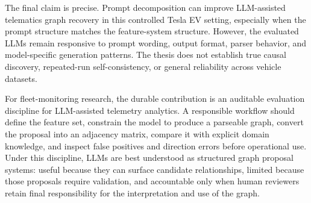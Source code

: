 The final claim is precise. Prompt decomposition can improve
LLM-assisted telematics graph recovery in this controlled Tesla EV setting,
especially when the prompt structure matches the feature-system structure.
However, the evaluated LLMs remain responsive to prompt wording, output format,
parser behavior, and model-specific generation patterns. The thesis does not
establish true causal discovery, repeated-run self-consistency, or general
reliability across vehicle datasets.

For fleet-monitoring research, the durable contribution is an auditable
evaluation discipline for LLM-assisted telemetry analytics. A responsible
workflow should define the feature set, constrain the model to produce a
parseable graph, convert the proposal into an adjacency matrix, compare it
with explicit domain knowledge, and inspect false positives and direction
errors before operational use. Under this discipline, LLMs are best understood
as structured graph proposal systems: useful because they can surface
candidate relationships, limited because those proposals require validation,
and accountable only when human reviewers retain final responsibility for the
interpretation and use of the graph.
